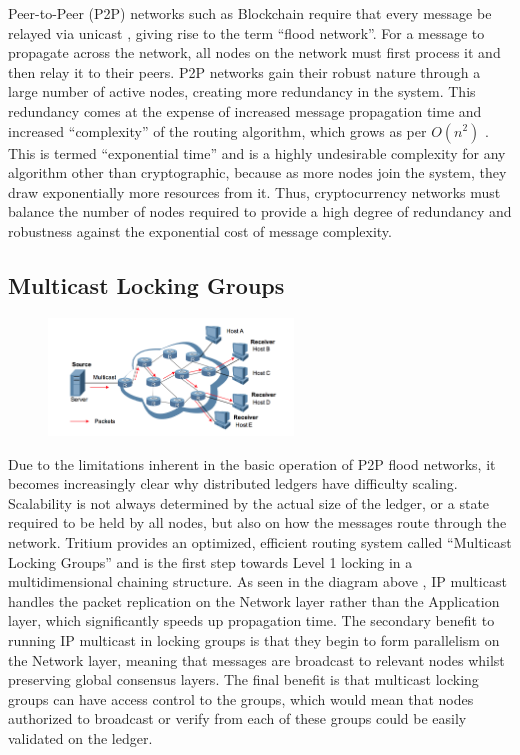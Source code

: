 \documentclass[11pt]{article}
\begin{document}
Peer-to-Peer (P2P) networks such as Blockchain require that every message be relayed via unicast \cite{Flood_Networks}, giving rise to the term ``flood network''.
For a message to propagate across the network, all nodes on the network must first process it and then relay it to their peers.
P2P networks gain their robust nature through a large number of active nodes, creating more redundancy in the system.
This redundancy comes at the expense of increased message propagation time and increased ``complexity'' of the routing algorithm, which grows as per $O(n^2)$ \cite{Big_O_Notation}.
This is termed ``exponential time'' and is a highly undesirable complexity for any algorithm other than cryptographic, because as more nodes join the system, they draw exponentially more resources from it.
Thus, cryptocurrency networks must balance the number of nodes required to provide a high degree of redundancy and robustness against the exponential cost of message complexity.

\subsection{Multicast Locking Groups}

\begin{figure}
    \centering
    \vspace{-15pt}
    \hspace{0pt}
    \includegraphics[width=0.58\textwidth]{./images/rsz_multicast.png}
\end{figure}

Due to the limitations inherent in the basic operation of P2P flood networks, it becomes increasingly clear why distributed ledgers have difficulty scaling.
Scalability is not always determined by the actual size of the ledger, or a state required to be held by all nodes, but also on how the messages route through the network.
Tritium provides an optimized, efficient routing system called ``Multicast Locking Groups'' and is the first step towards Level 1 locking in a multidimensional chaining structure.
As seen in the diagram above \cite{Mulicast}, IP multicast handles the packet replication on the Network layer rather than the Application layer, which significantly speeds up propagation time.
The secondary benefit to running IP multicast in locking groups is that they begin to form parallelism on the Network layer, meaning that messages are broadcast to relevant nodes whilst preserving global consensus layers.
The final benefit is that multicast locking groups can have access control to the groups, which would mean that nodes authorized to broadcast or verify from each of these groups could be easily validated on the ledger.
\end{document}
